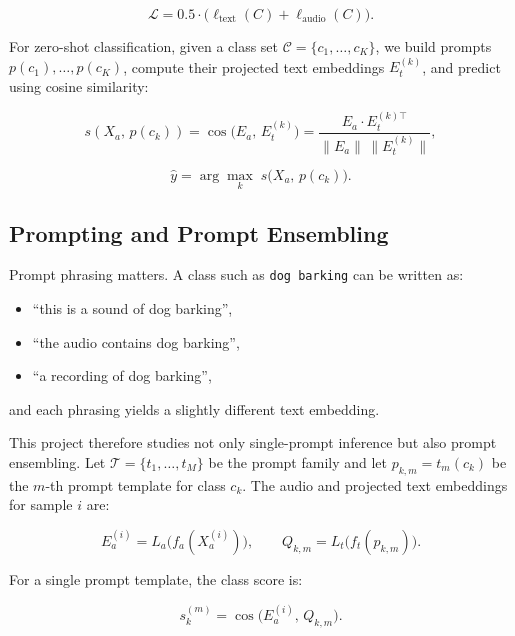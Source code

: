 \documentclass[11pt]{article}
\newcommand{\dataset}[1]{\texttt{#1}}
\begin{document}
\begin{equation}
\mathcal{L} = 0.5 \cdot \bigl(\ell_{\text{text}}(C) + \ell_{\text{audio}}(C)\bigr).
\end{equation}

For zero-shot classification, given a class set $\mathcal{C} = \{c_1, \dots,
c_K\}$, we build prompts $p(c_1), \dots, p(c_K)$, compute their projected text
embeddings $E_t^{(k)}$, and predict using cosine similarity:

\begin{equation}
s(X_a,\, p(c_k))
  = \cos\!\bigl(E_a,\, E_t^{(k)}\bigr)
  = \frac{E_a \cdot E_t^{(k)\top}}{\lVert E_a \rVert\,\lVert E_t^{(k)} \rVert},
\end{equation}

\begin{equation}
\hat{y} = \arg\max_k \; s\bigl(X_a,\, p(c_k)\bigr).
\end{equation}

\subsection{Prompting and Prompt Ensembling}

Prompt phrasing matters. A class such as \dataset{dog barking} can be written
as:
\begin{itemize}[leftmargin=1.25em]
  \item ``this is a sound of dog barking'',
  \item ``the audio contains dog barking'',
  \item ``a recording of dog barking'',
\end{itemize}
and each phrasing yields a slightly different text embedding.

This project therefore studies not only single-prompt inference but also prompt
ensembling. Let $\mathcal{T}=\{t_1,\dots,t_M\}$ be the prompt family and let
$p_{k,m}=t_m(c_k)$ be the $m$-th prompt template for class $c_k$. The audio
and projected text embeddings for sample $i$ are:

\begin{equation}
E_a^{(i)} = L_a\!\bigl(f_a(X_a^{(i)})\bigr),
\qquad
Q_{k,m} = L_t\!\bigl(f_t(p_{k,m})\bigr).
\end{equation}

For a single prompt template, the class score is:

\begin{equation}
s_k^{(m)} = \cos\!\bigl(E_a^{(i)},\, Q_{k,m}\bigr).
\end{equation}
\end{document}
